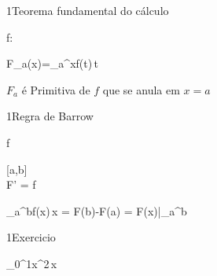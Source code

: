 \begin{multicols}{2}
\begin{sectionBox}1{Teorema fundamental do cálculo}

\begin{BM}[align*][\normalsize]
	f:\to{}
\end{BM}\relax

\begin{BM}
	F_a(x)=\int_{a}^{x}f(t)\,t
\end{BM}

$F_a$ é Primitiva de $f$ que se anula em $x=a$
\end{sectionBox}

\begin{sectionBox}1{Regra de Barrow}
\label{Barrow}

\begin{BM}[align*][\normalsize]
	f
	\begin{cases}
	\\	F' = f
	\end{cases}
\end{BM}

\begin{BM}
	\int_{a}^{b}f(x)\,\mathrm{d}x
=	F(b)-F(a)
=	\Delta F(x)\big|_{a}^{b}
\end{BM}

\end{sectionBox}\relax

\newpage

\begin{sectionBox}1{Exercicio}

\begin{BM}[align*][\normalsize]
	\int_{0}^{1}x^2\,x
\end{BM}

{


\begin{center}
\end{center}
}


\end{sectionBox}
\end{multicols}
